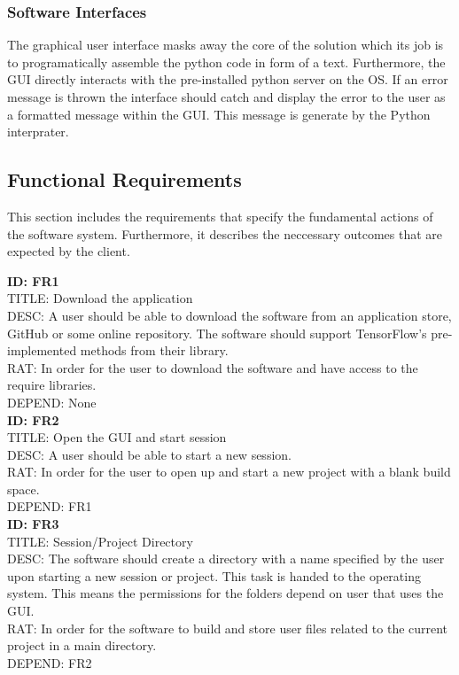 \documentclass[journal,10pt,onecolumn,compsoc]{IEEEtran} \usepackage[margin=1.0in]{geometry} \usepackage{pdfpages} \usepackage{graphicx}
\begin{document}
\subsubsection{Software Interfaces}

The graphical user interface masks away the core of the solution which its job is to programatically assemble the python code in form of a text.
Furthermore, the GUI directly interacts with the pre-installed python server on the OS.
If an error message is thrown the interface should catch and display the error to the user as a formatted message within the GUI.
This message is generate by the Python interprater.

\subsection{Functional Requirements}

This section includes the requirements that specify the fundamental actions of the software system.
Furthermore, it describes the neccessary outcomes that are expected by the client.

\noindent
\textbf{ID: FR1}\\
TITLE: Download the application\\
DESC: A user should be able to download the software from an application store, GitHub or some online repository. 
The software should support TensorFlow\texttrademark's pre-implemented methods from their library. \\
RAT: In order for the user to download the software and have access to the require libraries.\\
DEPEND: None\\

\noindent
\textbf{ID: FR2}\\
TITLE: Open the GUI and start session\\
DESC: A user should be able to start a new session. \\
RAT: In order for the user to open up and start a new project with a blank build space.\\
DEPEND: FR1\\

\noindent
\textbf{ID: FR3}\\
TITLE: Session/Project Directory\\
DESC: The software should create a directory with a name specified by the user upon starting a new session or project.
This task is handed to the operating system. This means the permissions for the folders depend on user that uses the GUI. \\
RAT: In order for the software to build and store user files related to the current project in a main directory.\\
DEPEND: FR2\\
\end{document}
